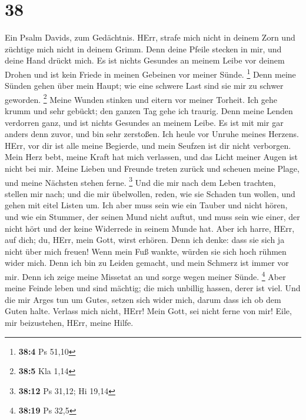 \hypertarget{section-37}{%
\section{38}\label{section-37}}

 Ein Psalm Davids, zum Gedächtnis.  HErr,
strafe mich nicht in deinem Zorn und züchtige mich nicht in deinem
Grimm.  Denn deine Pfeile stecken in mir, und deine Hand
drückt mich.  Es ist nichts Gesundes an meinem Leibe vor
deinem Drohen und ist kein Friede in meinen Gebeinen vor meiner Sünde.
\footnote{\textbf{38:4} Ps 51,10}  Denn meine Sünden gehen
über mein Haupt; wie eine schwere Last sind sie mir zu schwer geworden.
\footnote{\textbf{38:5} Kla 1,14}  Meine Wunden stinken
und eitern vor meiner Torheit.  Ich gehe krumm und sehr
gebückt; den ganzen Tag gehe ich traurig.  Denn meine
Lenden verdorren ganz, und ist nichts Gesundes an meinem Leibe.
 Es ist mit mir gar anders denn zuvor, und bin sehr
zerstoßen. Ich heule vor Unruhe meines Herzens.  HErr,
vor dir ist alle meine Begierde, und mein Seufzen ist dir nicht
verborgen.  Mein Herz bebt, meine Kraft hat mich
verlassen, und das Licht meiner Augen ist nicht bei mir. 
Meine Lieben und Freunde treten zurück und scheuen meine Plage, und
meine Nächsten stehen ferne. \footnote{\textbf{38:12} Ps 31,12; Hi 19,14}
 Und die mir nach dem Leben trachten, stellen mir nach;
und die mir übelwollen, reden, wie sie Schaden tun wollen, und gehen mit
eitel Listen um.  Ich aber muss sein wie ein Tauber und
nicht hören, und wie ein Stummer, der seinen Mund nicht auftut,
 und muss sein wie einer, der nicht hört und der keine
Widerrede in seinem Munde hat.  Aber ich harre, HErr, auf
dich; du, HErr, mein Gott, wirst erhören.  Denn ich
denke: dass sie sich ja nicht über mich freuen! Wenn mein Fuß wankte,
würden sie sich hoch rühmen wider mich.  Denn ich bin zu
Leiden gemacht, und mein Schmerz ist immer vor mir.  Denn
ich zeige meine Missetat an und sorge wegen meiner Sünde. \footnote{\textbf{38:19}
  Ps 32,5}  Aber meine Feinde leben und sind mächtig; die
mich unbillig hassen, derer ist viel.  Und die mir Arges
tun um Gutes, setzen sich wider mich, darum dass ich ob dem Guten halte.
 Verlass mich nicht, HErr! Mein Gott, sei nicht ferne von
mir!  Eile, mir beizustehen, HErr, meine Hilfe.

